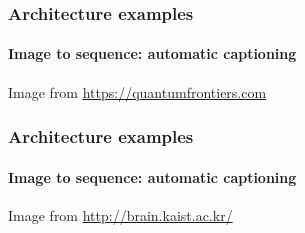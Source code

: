 \documentclass[9pt]{beamer}
\begin{document}
\begin{frame}
  \frametitle{Architecture examples}

  \framesubtitle{Image to sequence: automatic captioning}

  \begin{center}
  \end{center}
  {\small Image from \url{https://quantumfrontiers.com}}
\end{frame}

\begin{frame}
  \frametitle{Architecture examples}

  \framesubtitle{Image to sequence: automatic captioning}

  \begin{center}
  \end{center}

  {\small Image from \url{http://brain.kaist.ac.kr/}}
\end{frame}
\end{document}
